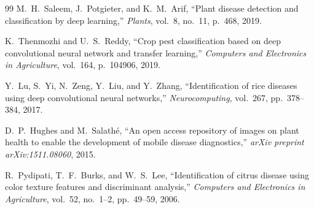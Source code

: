 \documentclass[11pt,a4paper]{article}
\begin{document}
\begin{thebibliography}{99}
M.\ H.\ Saleem, J.\ Potgieter, and K.\ M.\ Arif,
``Plant disease detection and classification by deep learning,''
\textit{Plants}, vol.\ 8, no.\ 11, p.\ 468, 2019.

K.\ Thenmozhi and U.\ S.\ Reddy,
``Crop pest classification based on deep convolutional neural network and
transfer learning,''
\textit{Computers and Electronics in Agriculture}, vol.\ 164, p.\ 104906,
2019.

Y.\ Lu, S.\ Yi, N.\ Zeng, Y.\ Liu, and Y.\ Zhang,
``Identification of rice diseases using deep convolutional neural networks,''
\textit{Neurocomputing}, vol.\ 267, pp.\ 378--384, 2017.

D.\ P.\ Hughes and M.\ Salathé,
``An open access repository of images on plant health to enable the
development of mobile disease diagnostics,''
\textit{arXiv preprint arXiv:1511.08060}, 2015.

R.\ Pydipati, T.\ F.\ Burks, and W.\ S.\ Lee,
``Identification of citrus disease using color texture features and
discriminant analysis,''
\textit{Computers and Electronics in Agriculture}, vol.\ 52, no.\ 1--2,
pp.\ 49--59, 2006.

\end{thebibliography}
\end{document}
